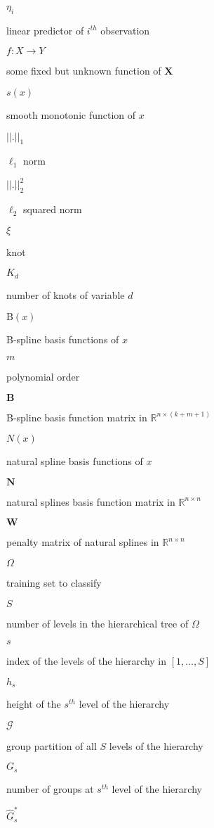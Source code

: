 \documentclass[]{book}
\begin{document}
\(\eta_i\)

linear predictor of \(i^{th}\) observation

\(f : X \rightarrow Y\)

some fixed but unknown function of \(\mathbf{X}\)

\(s(x)\)

smooth monotonic function of \(x\)

\(||.||_1\)

\(\ell_1\) norm

\(||.||_2^2\)

\(\ell_2\) squared norm

\(\xi\)

knot

\(K_d\)

number of knots of variable \(d\)

\(\mathrm{B}(x)\)

B-spline basis functions of \(x\)

\(m\)

polynomial order

\(\mathbf{B}\)

B-spline basis function matrix in \(\mathbb{R}^{n \times (k + m +1)}\)

\(N(x)\)

natural spline basis functions of \(x\)

\(\mathbf{N}\)

natural splines basis function matrix in \(\mathbb{R}^{n \times n}\)

\(\mathbf{W}\)

penalty matrix of natural splines in \(\mathbb{R}^{n \times n}\)

\(\Omega\)

training set to classify

\(S\)

number of levels in the hierarchical tree of \(\Omega\)

\(s\)

index of the levels of the hierarchy in \([1, \dots, S]\)

\(h_s\)

height of the \(s^{th}\) level of the hierarchy

\(\mathcal{G}\)

group partition of all \(S\) levels of the hierarchy

\(G_s\)

number of groups at \(s^{th}\) level of the hierarchy

\(\hat{G}_s^*\)
\end{document}
